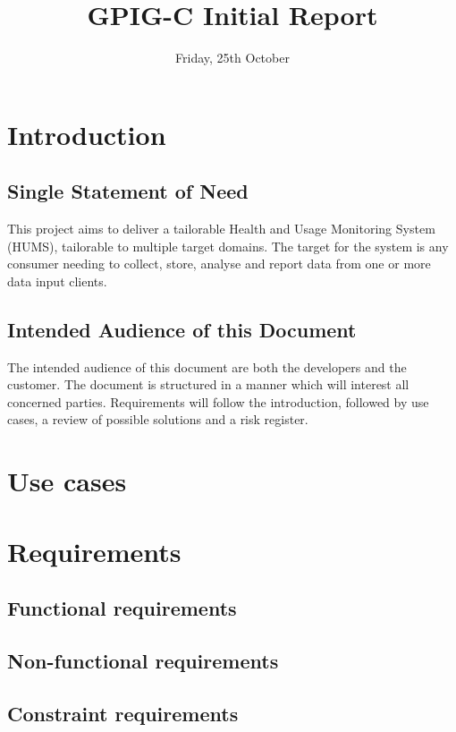 \documentclass[10pt,a4paper]{article}
\begin{document}
\title{\vspace{-1cm}GPIG-C Initial Report}
\author{}
\date{\vspace{-1cm} Friday, 25th October}
\maketitle
\thispagestyle{fancy} %

\section{Introduction}
\subsection{Single Statement of Need}
This project aims to deliver a tailorable Health and Usage Monitoring System (HUMS), tailorable to multiple target domains. The target for the system is any consumer needing to collect, store, analyse and report data from one or more data input clients.
\subsection{Intended Audience of this Document}
The intended audience of this document are both the developers and the customer. The document is structured in a manner which will interest all concerned parties. Requirements will follow the introduction, followed by use cases, a review of possible solutions and a risk register.

\section{Use cases}


\section{Requirements}

\subsection{Functional requirements}

\subsection{Non-functional requirements}

\subsection{Constraint requirements}
\end{document}
